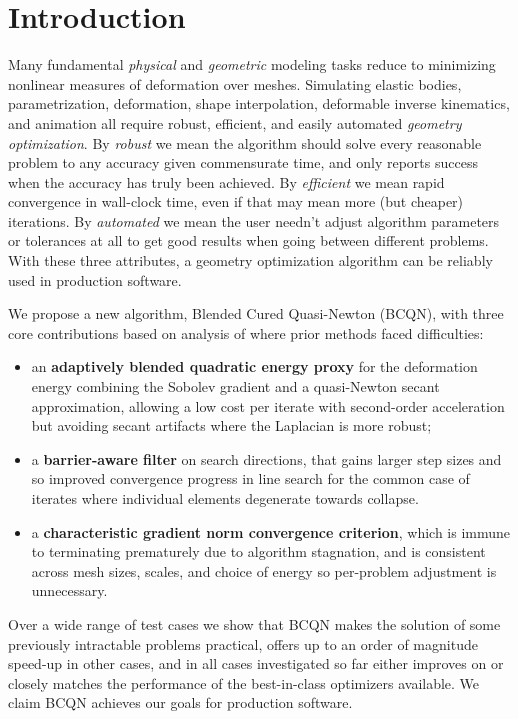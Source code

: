 \section{Introduction}
Many fundamental \emph{physical} and \emph{geometric} modeling tasks
reduce to minimizing nonlinear measures of deformation over meshes.
Simulating elastic bodies, parametrization, deformation, shape
interpolation, deformable inverse kinematics, and animation all
require robust, efficient, and easily automated \emph{geometry
optimization}.
By \emph{robust} we mean the algorithm should solve
every reasonable problem to any accuracy given commensurate time,
and only reports success when the accuracy has truly been achieved.
By \emph{efficient} we mean rapid convergence in wall-clock time,
even if that may mean more (but cheaper) iterations.
By \emph{automated} we mean the user needn't adjust algorithm
parameters or tolerances at all to get good results
when going between different problems. With these three attributes,
a geometry optimization algorithm can be reliably used in production
software.

We propose a new algorithm, Blended Cured Quasi-Newton (BCQN),
with three core contributions based on analysis of where prior methods
faced difficulties:
\begin{itemize}
\item an \textbf{adaptively blended quadratic energy proxy} for the
deformation energy combining the Sobolev gradient and a quasi-Newton
secant approximation, allowing a low cost per iterate with second-order
acceleration but avoiding secant artifacts where the Laplacian is
more robust;
\item a \textbf{barrier-aware filter} 
on search directions, that gains larger step sizes and so improved convergence progress in line search for the common case of iterates where individual elements degenerate towards collapse.
\item a \textbf{characteristic gradient norm convergence criterion},
which is immune to terminating prematurely due to algorithm stagnation,
and is consistent across mesh sizes, scales, and choice of energy
so per-problem adjustment is unnecessary.
\end{itemize}
Over a wide range of test cases we show that BCQN makes the solution
of some previously intractable problems practical, offers up to an
order of magnitude speed-up in other cases, and in all cases
investigated so far either improves on or closely matches the
performance of the best-in-class optimizers available. We claim
BCQN achieves our goals for production software.

